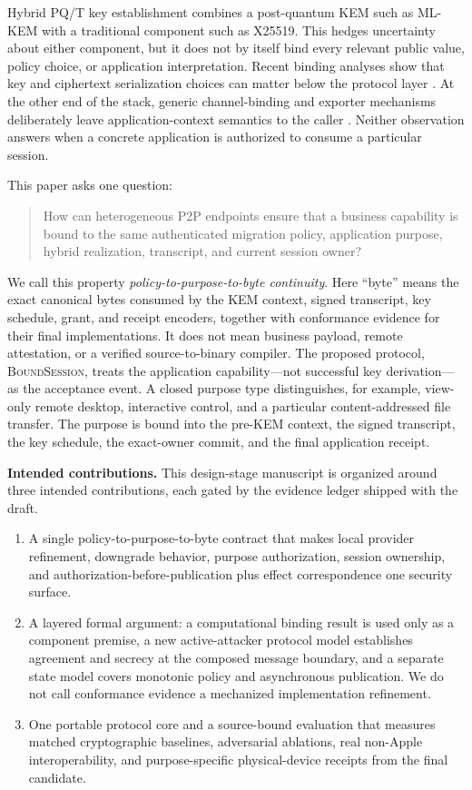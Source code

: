 \documentclass[journal]{IEEEtran}
\newcommand{\system}{\textsc{BoundSession}}
\begin{document}
Hybrid PQ/T key establishment combines a post-quantum KEM such as ML-KEM with a
traditional component such as X25519. This hedges uncertainty about either
component, but it does not by itself bind every relevant public value, policy
choice, or application interpretation. Recent binding analyses show that key and
ciphertext serialization choices can matter below the protocol layer
\cite{cdm2024,schmieg2024,chempat2025}. At the other end of the stack, generic
channel-binding and exporter mechanisms deliberately leave application-context
semantics to the caller \cite{rfc5705,rfc9266}. Neither observation answers when
a concrete application is authorized to consume a particular session.

This paper asks one question:

\begin{quote}
How can heterogeneous P2P endpoints ensure that a business capability is bound
to the same authenticated migration policy, application purpose, hybrid
realization, transcript, and current session owner?
\end{quote}

We call this property \emph{policy-to-purpose-to-byte continuity}. Here
``byte'' means the exact canonical bytes consumed by the KEM context, signed
transcript, key schedule, grant, and receipt encoders, together with conformance
evidence for their final implementations. It does not mean business payload,
remote attestation, or a verified source-to-binary compiler. The proposed
protocol, \system{}, treats the application capability---not successful key
derivation---as the acceptance event. A closed purpose type distinguishes, for
example, view-only remote desktop, interactive control, and a particular
content-addressed file transfer. The purpose is bound into the pre-KEM context,
the signed transcript, the key schedule, the exact-owner commit, and the final
application receipt.

\textbf{Intended contributions.} This design-stage manuscript is organized
around three intended contributions, each gated by the evidence ledger shipped
with the draft.

\begin{enumerate}
\item A single policy-to-purpose-to-byte contract that makes local provider refinement,
      downgrade behavior, purpose authorization, session ownership, and
      authorization-before-publication plus effect correspondence one security
      surface.
\item A layered formal argument: a computational binding result is used only as
      a component premise, a new active-attacker protocol model establishes
      agreement and secrecy at the composed message boundary, and a separate
      state model covers monotonic policy and asynchronous publication. We do not
      call conformance evidence a mechanized implementation refinement.
\item One portable protocol core and a source-bound evaluation that measures
      matched cryptographic baselines, adversarial ablations, real non-Apple
      interoperability, and purpose-specific physical-device receipts from the
      final candidate.
\end{enumerate}
\end{document}
